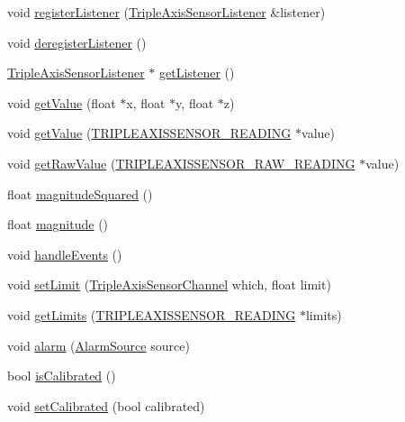 \begin{DoxyCompactItemize}
\item 
void \hyperlink{classflame_1_1_triple_axis_sensor_a4a655be3990763a0ecddcf081543ee82}{register\-Listener} (\hyperlink{classflame_1_1_triple_axis_sensor_listener}{Triple\-Axis\-Sensor\-Listener} \&listener)
\item 
void \hyperlink{classflame_1_1_triple_axis_sensor_ab3051eced113bc27eff59be1024f2da0}{deregister\-Listener} ()
\item 
\hyperlink{classflame_1_1_triple_axis_sensor_listener}{Triple\-Axis\-Sensor\-Listener} $\ast$ \hyperlink{classflame_1_1_triple_axis_sensor_aabbc82ab78ff5869e8cec0d09c8cd053}{get\-Listener} ()
\item 
void \hyperlink{classflame_1_1_triple_axis_sensor_a8d1f12483d3a0a068cc623df425ae831}{get\-Value} (float $\ast$x, float $\ast$y, float $\ast$z)
\item 
void \hyperlink{classflame_1_1_triple_axis_sensor_ab44fd1a3caf553df2e57a7a654dc457e}{get\-Value} (\hyperlink{namespaceflame_a11b86dc8b6fd50d24cec8b9f0259289b}{T\-R\-I\-P\-L\-E\-A\-X\-I\-S\-S\-E\-N\-S\-O\-R\-\_\-\-R\-E\-A\-D\-I\-N\-G} $\ast$value)
\item 
void \hyperlink{classflame_1_1_triple_axis_sensor_aa036218566ff36f6d5320cf66bf73dbc}{get\-Raw\-Value} (\hyperlink{namespaceflame_ab883ad815041824ba548753dae327bc2}{T\-R\-I\-P\-L\-E\-A\-X\-I\-S\-S\-E\-N\-S\-O\-R\-\_\-\-R\-A\-W\-\_\-\-R\-E\-A\-D\-I\-N\-G} $\ast$value)
\item 
float \hyperlink{classflame_1_1_triple_axis_sensor_af1f6e5c2dcf25070464dcc65c09cf1b5}{magnitude\-Squared} ()
\item 
float \hyperlink{classflame_1_1_triple_axis_sensor_a6d8c6a6011853e2015956c8936ed19ff}{magnitude} ()
\item 
void \hyperlink{classflame_1_1_triple_axis_sensor_a2ba2508c4a53376126504055e19bcee7}{handle\-Events} ()
\item 
void \hyperlink{classflame_1_1_triple_axis_sensor_a87a4e16d1637a7acd6c35ab200ea6d74}{set\-Limit} (\hyperlink{namespaceflame_a626e8c99d0f4f232b95e7089c113095a}{Triple\-Axis\-Sensor\-Channel} which, float limit)
\item 
void \hyperlink{classflame_1_1_triple_axis_sensor_a512ee16a5b45a7e9a30162976538c744}{get\-Limits} (\hyperlink{namespaceflame_a11b86dc8b6fd50d24cec8b9f0259289b}{T\-R\-I\-P\-L\-E\-A\-X\-I\-S\-S\-E\-N\-S\-O\-R\-\_\-\-R\-E\-A\-D\-I\-N\-G} $\ast$limits)
\item 
void \hyperlink{classflame_1_1_triple_axis_sensor_ad5fbc92633b96e9432c42a6e405eafbc}{alarm} (\hyperlink{namespaceflame_a6d176ba245556716fd3e32006bb7cfe5}{Alarm\-Source} source)
\item 
bool \hyperlink{classflame_1_1_triple_axis_sensor_ac41a5efbd52c5b79acd4b1976f43ec84}{is\-Calibrated} ()
\item 
void \hyperlink{classflame_1_1_triple_axis_sensor_ac758b7d4bc3ad72397090e782e947976}{set\-Calibrated} (bool calibrated)
\end{DoxyCompactItemize}
